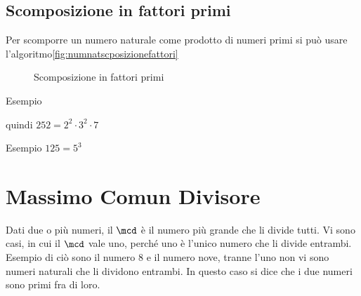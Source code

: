 \subsection{Scomposizione in fattori primi}
Per scomporre un numero naturale come prodotto di numeri primi  si può usare  l'algoritmo\nobs\vref{fig:numnatscposizionefattori}
\begin{figure}
\centering
{}
	\caption{Scomposizione in fattori primi}
	\label{fig:numnatscposizionefattori}
\end{figure}
	
Esempio 


quindi $252=2^2\cdot 3^2\cdot 7$

Esempio
$125=5^3$
	
\section{Massimo Comun Divisore}
\label{sec:macdNaturali}

Dati due o più numeri, il $\mcd$ è il numero più grande che li divide tutti. Vi sono casi, in cui il $\mcd$ vale uno, perché uno è l'unico numero che li divide entrambi. Esempio di ciò sono il numero 8 e il numero nove, tranne l'uno non vi sono numeri naturali che li dividono entrambi. In questo caso si dice
 che i due numeri sono primi fra di loro.
 	
